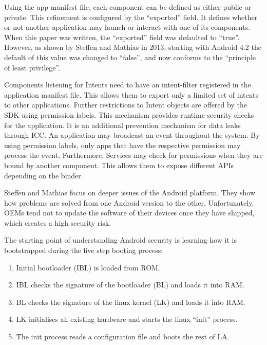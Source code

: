 Using the app manifest file, each component can be defined as either public or private. This refinement is configured by the ``exported'' field. It defines whether or not another application may launch or interact with one of its components. When this paper was written, the ``exported'' field was defaulted to ``true''. However, as shown by Steffen and Mathias \cite{liebergeld2013android}  in 2013, starting with Android 4.2  the default of this value was changed to ``false'', and now conforms to the ``principle of least privilege''.

Components listening for Intents need to have an intent-filter registered in the application manifest file. This allows them to export only a limited set of intents to other applications. Further restrictions to Intent objects are offered by the SDK using permission labels. This mechanism provides runtime security checks for the application. It is an additional prevention mechanism for data leaks through ICC. An application may broadcast an event throughout the system. By using permission labels, only apps that have the respective permission may process the event. Furthermore, Services may check for permissions when they are bound by another component. This allows them to expose different APIs depending on the binder.

Steffen and Mathias \cite{liebergeld2013android} focus on deeper issues of the Android platform. They show how problems are solved from one Android version to the other. Unfortunately, OEMs tend not to update the software of their devices once they have shipped, which creates a high security risk.

The starting point of understanding Android security is learning how it is bootstrapped during the five step booting process:
\begin{enumerate}
	\item Initial bootloader (IBL) is loaded from ROM.
	\item IBL checks the signature of the bootloader (BL) and loads it into RAM.
	\item BL checks the signature of the linux kernel (LK) and loads it into RAM.
	\item LK initialises all existing hardware and starts the linux ``init'' process.
	\item The init process reads a configuration file and boots the rest of LA.
\end{enumerate}

